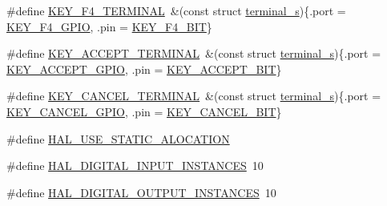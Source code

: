 \begin{DoxyCompactItemize}
\#define \hyperlink{group__hal_ga88e24403963b95f3056acd51ba585d78}{K\+E\+Y\+\_\+\+F4\+\_\+\+T\+E\+R\+M\+I\+N\+AL}~\&(const struct \hyperlink{structterminal__s}{terminal\+\_\+s})\{.port = \hyperlink{group__hal_gabc1b6065dd7a4f9e7c7eb492f7d3d548}{K\+E\+Y\+\_\+\+F4\+\_\+\+G\+P\+IO}, .pin = \hyperlink{group__hal_gadd1233da3fb79555176e60c1433f5d2c}{K\+E\+Y\+\_\+\+F4\+\_\+\+B\+IT}\}
\item 
\#define \hyperlink{group__hal_gaf75cad6972c6cb963c517044a838640e}{K\+E\+Y\+\_\+\+A\+C\+C\+E\+P\+T\+\_\+\+T\+E\+R\+M\+I\+N\+AL}~\&(const struct \hyperlink{structterminal__s}{terminal\+\_\+s})\{.port = \hyperlink{group__hal_gaec67cfa1c357906d3146de59945a5af1}{K\+E\+Y\+\_\+\+A\+C\+C\+E\+P\+T\+\_\+\+G\+P\+IO}, .pin = \hyperlink{group__hal_ga099967afffab053d7b61dc41f1806b8d}{K\+E\+Y\+\_\+\+A\+C\+C\+E\+P\+T\+\_\+\+B\+IT}\}
\item 
\#define \hyperlink{group__hal_ga578d1b8afa92612bb447a8ce0d8dcb17}{K\+E\+Y\+\_\+\+C\+A\+N\+C\+E\+L\+\_\+\+T\+E\+R\+M\+I\+N\+AL}~\&(const struct \hyperlink{structterminal__s}{terminal\+\_\+s})\{.port = \hyperlink{group__hal_ga072fd7b6b6eb89b2e4a61425d8b81b09}{K\+E\+Y\+\_\+\+C\+A\+N\+C\+E\+L\+\_\+\+G\+P\+IO}, .pin = \hyperlink{group__hal_ga26ec6a583f60654278e37c9d911d791b}{K\+E\+Y\+\_\+\+C\+A\+N\+C\+E\+L\+\_\+\+B\+IT}\}
\item 
\#define \hyperlink{group__hal_gadf51327f29010bbae4753c890b3afe75}{H\+A\+L\+\_\+\+U\+S\+E\+\_\+\+S\+T\+A\+T\+I\+C\+\_\+\+A\+L\+O\+C\+A\+T\+I\+ON}
\item 
\#define \hyperlink{group__hal_gac336a3519ee1c47e1f7eb9a86e2a4c60}{H\+A\+L\+\_\+\+D\+I\+G\+I\+T\+A\+L\+\_\+\+I\+N\+P\+U\+T\+\_\+\+I\+N\+S\+T\+A\+N\+C\+ES}~10
\item 
\#define \hyperlink{group__hal_ga497138b2c8967d0ce8b4629a3b9498c0}{H\+A\+L\+\_\+\+D\+I\+G\+I\+T\+A\+L\+\_\+\+O\+U\+T\+P\+U\+T\+\_\+\+I\+N\+S\+T\+A\+N\+C\+ES}~10
\end{DoxyCompactItemize}
